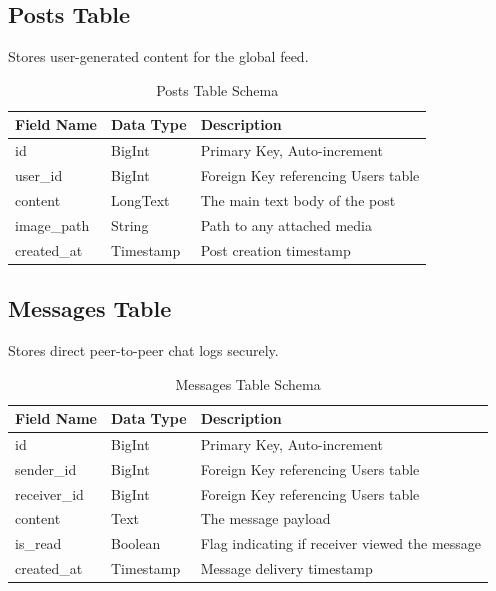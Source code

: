 \subsection{Posts Table}
Stores user-generated content for the global feed.

\begin{table}[H]
    \centering
    \small
    \begin{tabular}{|l|l|p{8cm}|}
        \hline
        \textbf{Field Name} & \textbf{Data Type} & \textbf{Description} \\
        \hline
        id & BigInt & Primary Key, Auto-increment \\
        \hline
        user\_id & BigInt & Foreign Key referencing Users table \\
        \hline
        content & LongText & The main text body of the post \\
        \hline
        image\_path & String & Path to any attached media \\
        \hline
        created\_at & Timestamp & Post creation timestamp \\
        \hline
    \end{tabular}
    \vspace{0.2cm}
    \caption{Posts Table Schema}
    \label{tab:posts_schema}
\end{table}

\subsection{Messages Table}
Stores direct peer-to-peer chat logs securely.

\begin{table}[H]
    \centering
    \small
    \begin{tabular}{|l|l|p{8cm}|}
        \hline
        \textbf{Field Name} & \textbf{Data Type} & \textbf{Description} \\
        \hline
        id & BigInt & Primary Key, Auto-increment \\
        \hline
        sender\_id & BigInt & Foreign Key referencing Users table \\
        \hline
        receiver\_id & BigInt & Foreign Key referencing Users table \\
        \hline
        content & Text & The message payload \\
        \hline
        is\_read & Boolean & Flag indicating if receiver viewed the message \\
        \hline
        created\_at & Timestamp & Message delivery timestamp \\
        \hline
    \end{tabular}
    \vspace{0.2cm}
    \caption{Messages Table Schema}
    \label{tab:messages_schema}
\end{table}

